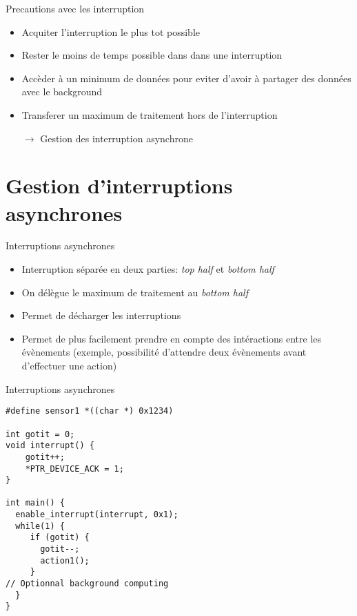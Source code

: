 \begin{frame}{Precautions avec les interruption}
  \begin{itemize} 
  \item Acquiter l'interruption le plus tot possible
  \item Rester le moins de temps possible dans dans une interruption
  \item Accèder à un minimum de données pour eviter d'avoir à partager
    des données avec le background
  \item Transferer un maximum de traitement hors de l'interruption
  \item[$\rightarrow$] Gestion des interruption asynchrone
  \end{itemize} 
\end{frame} 

\section{Gestion d'interruptions asynchrones} 

\begin{frame}[fragile]{Interruptions asynchrones}
  \begin{itemize} 
  \item  Interruption  séparée en  deux  parties:  \emph{top half}  et
    \emph{bottom half}
  \item On délègue le maximum de traitement au \emph{bottom half}
  \item Permet de décharger les interruptions
  \item Permet  de plus facilement prendre en  compte des intéractions
    entre  les   évènements  (exemple,  possibilité   d'attendre  deux
    évènements avant d'effectuer une action)
  \end{itemize}
\end{frame}

\begin{frame}[fragile]{Interruptions asynchrones}
  \begin{lstlisting} 
#define sensor1 *((char *) 0x1234)

int gotit = 0;
void interrupt() {
    gotit++;
    *PTR_DEVICE_ACK = 1;
}

int main() {
  enable_interrupt(interrupt, 0x1);
  while(1) {
     if (gotit) {
       gotit--;
       action1();
     }
// Optionnal background computing 
  }
}
  \end{lstlisting} 
\end{frame} 

